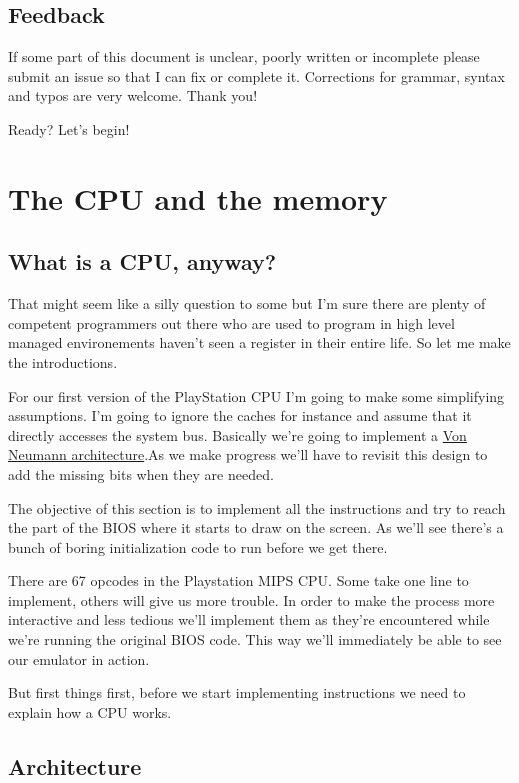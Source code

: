 \documentclass{article}
\begin{document}
\subsection{Feedback}

If some part of this document is unclear, poorly written or incomplete
please submit an issue so that I can fix or complete it. Corrections
for grammar, syntax and typos are very welcome. Thank you!

Ready? Let's begin!


\section{The CPU and the memory}

\subsection{What is a CPU, anyway?}

That might seem like a silly question to some but I'm sure there are
plenty of competent programmers out there who are used to program in
high level managed environements haven't seen a register in their
entire life. So let me make the introductions.

For our first version of the PlayStation CPU I'm going to make some
simplifying assumptions. I'm going to ignore the caches for instance
and assume that it directly accesses the system bus. Basically we're
going to implement a
\href{https://en.wikipedia.org/wiki/Von_Neumann_architecture}{Von
 Neumann architecture}.As we make progress we'll have to revisit this
design to add the missing bits when they are needed.

The objective of this section is to implement all the instructions and
try to reach the part of the BIOS where it starts to draw on the
screen. As we'll see there's a bunch of boring initialization code to
run before we get there.

There are 67 opcodes in the Playstation MIPS CPU. Some take one line
to implement, others will give us more trouble. In order to make the
process more interactive and less tedious we'll implement them as
they're encountered while we're running the original BIOS code. This
way we'll immediately be able to see our emulator in action.

But first things first, before we start implementing instructions we
need to explain how a CPU works.

\subsection{Architecture}
\end{document}
